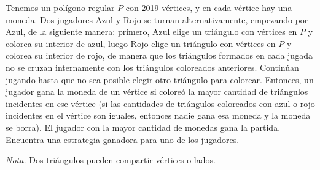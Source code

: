 Tenemos un polígono regular $P$ con 2019 vértices, y en cada vértice hay una moneda. Dos jugadores Azul y Rojo se turnan alternativamente, empezando por Azul, de la siguiente manera: primero, Azul elige un triángulo con vértices en $P$ y colorea su interior de azul, luego Rojo elige un triángulo con vértices en $P$ y colorea su interior de rojo, de manera que los triángulos formados en cada jugada no se cruzan internamente con los triángulos coloreados anteriores. Continúan jugando hasta que no sea posible elegir otro triángulo para colorear. Entonces, un jugador gana la moneda de un vértice si coloreó la mayor cantidad de triángulos incidentes en ese vértice (si las cantidades de triángulos coloreados con azul o rojo incidentes en el vértice son iguales, entonces nadie gana esa moneda y la moneda se borra). El jugador con la mayor cantidad de monedas gana la partida.  Encuentra una estrategia ganadora para uno de los jugadores. 


\textit{Nota.} Dos triángulos pueden compartir vértices o lados.
